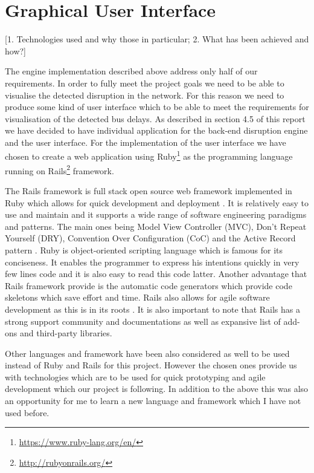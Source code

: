 \FloatBarrier
\section{Graphical User Interface}
[1. Technologies used and why those in particular; 2. What has been achieved and how?]

The engine implementation described above address only half of our requirements. In order to fully meet the project goals we need to be able to visualise the detected disruption in the network. For this reason we need to produce some kind of user interface which to be able to meet the requirements for visualisation of the detected bus delays. As described in section 4.5 of this report we have decided to have individual application for the back-end disruption engine and the user interface. For the implementation of the user interface we have chosen to create a web application using Ruby\footnote{\url{https://www.ruby-lang.org/en/}} as the programming language running on Rails\footnote{\url{http://rubyonrails.org/}} framework.

The Rails framework is full stack open source web framework implemented in Ruby which allows for quick development and deployment \cite{guide2006agile}. It is relatively easy to use and maintain and it supports a wide range of software engineering paradigms and patterns. The main ones being Model View Controller (MVC), Don't Repeat Yourself (DRY), Convention Over Configuration (CoC) and the Active Record pattern \cite{fowler2003patterns}. Ruby is object-oriented scripting language which is famous for its conciseness. It enables the programmer to express his intentions quickly in very few lines code and it is also easy to read this code latter. Another advantage that Rails framework provide is the automatic code generators which provide code skeletons which save effort and time. Rails also allows for agile software development as this is in its roots \cite{guide2006agile}. It is also important to note that Rails has a strong support community and documentations as well as expansive list of add-ons and third-party libraries.

Other languages and framework have been also considered as well to be used instead of Ruby and Rails for this project. However the chosen ones provide us with technologies which are to be used for quick prototyping and agile development which our project is following. In addition to the above this was also an opportunity for me to learn a new language and framework which I have not used before.

